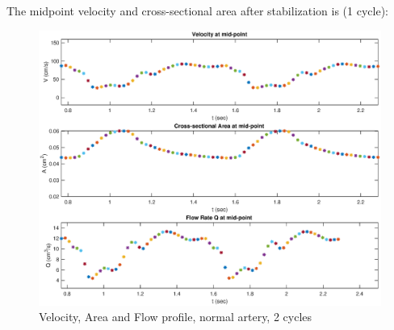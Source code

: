 \documentclass[12pt]{article} %
\begin{document}
The midpoint velocity and cross-sectional area after stabilization is (1 cycle):
\begin{figure}[h!]
\caption{Velocity, Area and Flow profile, normal artery, 2 cycles}
\centering
\includegraphics[width=1.0\textwidth]{normal3.eps}
\end{figure}
\end{document}

